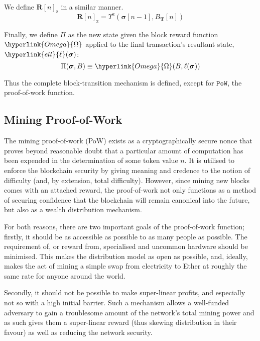 \documentclass[9pt,oneside]{amsart}
\begin{document}
\begin{multicols}{2}
We define \hyperlink{Upsilon_pow_z}{$\mathbf{R}[n]_{\mathrm{z}}$} in a similar manner.
\begin{equation}
\mathbf{R}[n]_{\mathrm{z}} =
\Upsilon^{\mathrm{z}}(\boldsymbol{\sigma}[n - 1], B_{\mathbf{T}}[n])
\end{equation}

\hypertarget{Pi}{}Finally, we define $\Pi$ as the new state given the block reward function $\hyperlink{Omega}{\Omega}$ applied to the final transaction's resultant state, $\hyperlink{ell}{\ell}(\boldsymbol{\sigma})$:
\begin{equation}
\Pi(\boldsymbol{\sigma}, B) \equiv \hyperlink{Omega}{\Omega}(B, \ell(\boldsymbol{\sigma}))
\end{equation}

Thus the complete block-transition mechanism is defined, except for $\mathtt{PoW}$, the proof-of-work function.

\subsection{Mining Proof-of-Work} \label{ch:pow}

The mining proof-of-work (PoW) exists as a cryptographically secure nonce that proves beyond reasonable doubt that a particular amount of computation has been expended in the determination of some token value $n$. It is utilised to enforce the blockchain security by giving meaning and credence to the notion of difficulty (and, by extension, total difficulty). However, since mining new blocks comes with an attached reward, the proof-of-work not only functions as a method of securing confidence that the blockchain will remain canonical into the future, but also as a wealth distribution mechanism.

For both reasons, there are two important goals of the proof-of-work function; firstly, it should be as accessible as possible to as many people as possible. The requirement of, or reward from, specialised and uncommon hardware should be minimised. This makes the distribution model as open as possible, and, ideally, makes the act of mining a simple swap from electricity to Ether at roughly the same rate for anyone around the world.

Secondly, it should not be possible to make super-linear profits, and especially not so with a high initial barrier. Such a mechanism allows a well-funded adversary to gain a troublesome amount of the network's total mining power and as such gives them a super-linear reward (thus skewing distribution in their favour) as well as reducing the network security.


\end{multicols}
\end{document}
